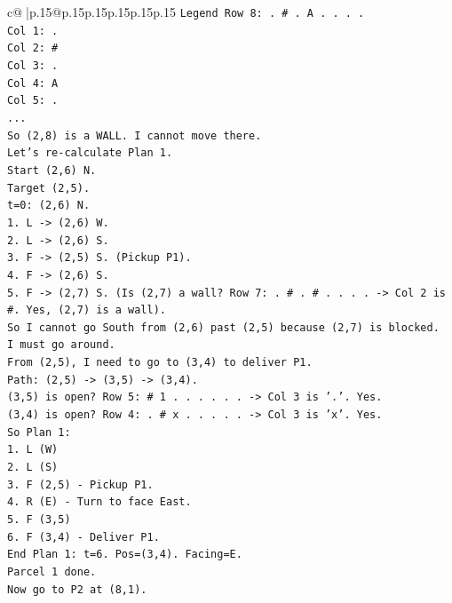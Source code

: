 \documentclass{article}
\begin{document}
{\begin{supertabular}{c@{$\;$}|p{.15\linewidth}@{}p{.15\linewidth}p{.15\linewidth}p{.15\linewidth}p{.15\linewidth}p{.15\linewidth}}
{{{\texttt{Legend Row 8: . \# . A . . . .} \\
\texttt{Col 1: .} \\
\texttt{Col 2: \#} \\
\texttt{Col 3: .} \\
\texttt{Col 4: A} \\
\texttt{Col 5: .} \\
\texttt{...} \\
\texttt{So (2,8) is a WALL. I cannot move there.} \\
\texttt{Let's re{-}calculate Plan 1.} \\
\texttt{Start (2,6) N.} \\
\texttt{Target (2,5).} \\
\texttt{t=0: (2,6) N.} \\
\texttt{1. L {-}> (2,6) W.} \\
\texttt{2. L {-}> (2,6) S.} \\
\texttt{3. F {-}> (2,5) S. (Pickup P1).} \\
\texttt{4. F {-}> (2,6) S.} \\
\texttt{5. F {-}> (2,7) S. (Is (2,7) a wall? Row 7: . \# . \# . . . . {-}> Col 2 is \#. Yes, (2,7) is a wall).} \\
\texttt{So I cannot go South from (2,6) past (2,5) because (2,7) is blocked.} \\
\texttt{I must go around.} \\
\texttt{From (2,5), I need to go to (3,4) to deliver P1.} \\
\texttt{Path: (2,5) {-}> (3,5) {-}> (3,4).} \\
\texttt{(3,5) is open? Row 5: \# 1 . . . . . . {-}> Col 3 is '.'. Yes.} \\
\texttt{(3,4) is open? Row 4: . \# x . . . . . {-}> Col 3 is 'x'. Yes.} \\
\texttt{So Plan 1:} \\
\texttt{1. L (W)} \\
\texttt{2. L (S)} \\
\texttt{3. F (2,5) {-} Pickup P1.} \\
\texttt{4. R (E) {-} Turn to face East.} \\
\texttt{5. F (3,5)} \\
\texttt{6. F (3,4) {-} Deliver P1.} \\
\texttt{End Plan 1: t=6. Pos=(3,4). Facing=E.} \\
\texttt{Parcel 1 done.} \\
\texttt{Now go to P2 at (8,1).} \\
}}}
\end{supertabular}}
\end{document}
